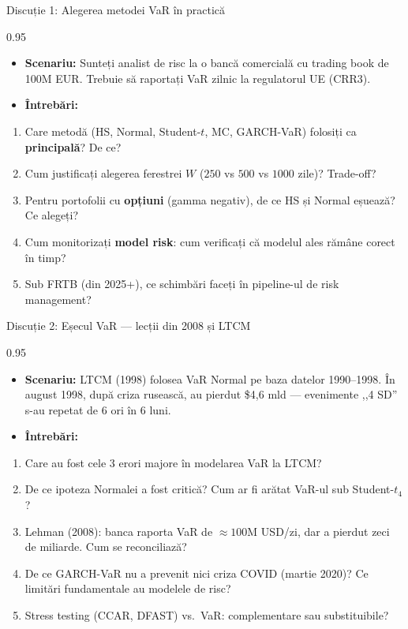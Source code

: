\documentclass[9pt, aspectratio=169, t]{beamer}
\begin{document}
\begin{frame}[shrink=10]{Discuție 1: Alegerea metodei VaR în practică}
\begin{cminipage}{0.95\textwidth}
    \begin{itemize}\setlength{\itemsep}{0pt}
        \item \textbf{Scenariu:} Sunteți analist de risc la o bancă comercială cu trading book de 100M EUR. Trebuie să raportați VaR zilnic la regulatorul UE (CRR3).
        \item \textbf{Întrebări:}
    \end{itemize}
    \begin{enumerate}\setlength{\itemsep}{0pt}
        \item Care metodă (HS, Normal, Student-$t$, MC, GARCH-VaR) folosiți ca \textbf{principală}? De ce?
        \item Cum justificați alegerea ferestrei $W$ ($250$ vs $500$ vs $1000$ zile)? Trade-off?
        \item Pentru portofolii cu \textbf{opțiuni} (gamma negativ), de ce HS și Normal eșuează? Ce alegeți?
        \item Cum monitorizați \textbf{model risk}: cum verificați că modelul ales rămâne corect în timp?
        \item Sub FRTB (din 2025+), ce schimbări faceți în pipeline-ul de risk management?
    \end{enumerate}
\end{cminipage}
\end{frame}

\begin{frame}[shrink=10]{Discuție 2: Eșecul VaR --- lecții din 2008 și LTCM}
\begin{cminipage}{0.95\textwidth}
    \begin{itemize}\setlength{\itemsep}{0pt}
        \item \textbf{Scenariu:} LTCM (1998) folosea VaR Normal pe baza datelor 1990--1998. În august 1998, după criza rusească, au pierdut \$4{,}6 mld --- evenimente ,,4 SD'' s-au repetat de 6 ori în 6 luni.
        \item \textbf{Întrebări:}
    \end{itemize}
    \begin{enumerate}\setlength{\itemsep}{0pt}
        \item Care au fost cele 3 erori majore în modelarea VaR la LTCM?
        \item De ce ipoteza Normalei a fost critică? Cum ar fi arătat VaR-ul sub Student-$t_4$?
        \item Lehman (2008): banca raporta VaR de $\approx 100$M USD/zi, dar a pierdut zeci de miliarde. Cum se reconciliază?
        \item De ce GARCH-VaR nu a prevenit nici criza COVID (martie 2020)? Ce limitări fundamentale au modelele de risc?
        \item Stress testing (CCAR, DFAST) vs.\ VaR: complementare sau substituibile?
    \end{enumerate}
\end{cminipage}
\end{frame}
\end{document}

